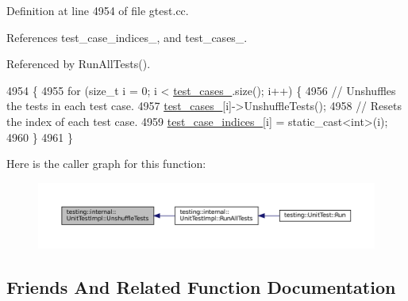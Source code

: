 Definition at line 4954 of file gtest.\+cc.



References test\+\_\+case\+\_\+indices\+\_\+, and test\+\_\+cases\+\_\+.



Referenced by Run\+All\+Tests().


\begin{DoxyCode}
4954                                   \{
4955   \textcolor{keywordflow}{for} (\textcolor{keywordtype}{size\_t} i = 0; i < \hyperlink{classtesting_1_1internal_1_1UnitTestImpl_a79ec0f733ada2898efd1a7fbd8587fb3}{test\_cases\_}.size(); i++) \{
4956     \textcolor{comment}{// Unshuffles the tests in each test case.}
4957     \hyperlink{classtesting_1_1internal_1_1UnitTestImpl_a79ec0f733ada2898efd1a7fbd8587fb3}{test\_cases\_}[i]->UnshuffleTests();
4958     \textcolor{comment}{// Resets the index of each test case.}
4959     \hyperlink{classtesting_1_1internal_1_1UnitTestImpl_a9b30891f1a9d5b5c25de2bef0f0bb49a}{test\_case\_indices\_}[i] = \textcolor{keyword}{static\_cast<}\textcolor{keywordtype}{int}\textcolor{keyword}{>}(i);
4960   \}
4961 \}
\end{DoxyCode}
Here is the caller graph for this function\+:
\nopagebreak
\begin{figure}[H]
\begin{center}
\leavevmode
\includegraphics[width=350pt]{classtesting_1_1internal_1_1UnitTestImpl_a1ee7db3bf8284dd9dce4dc857564bce3_icgraph}
\end{center}
\end{figure}


\subsection{Friends And Related Function Documentation}
\mbox{\label{classtesting_1_1internal_1_1UnitTestImpl_a893404438388dec058dc5c02e8f9a014}} 
